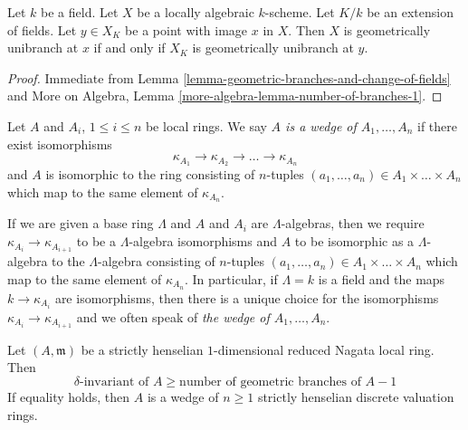 \begin{lemma}
\label{lemma-geometrically-unibranch-and-change-of-fields}
Let $k$ be a field. Let $X$ be a locally algebraic $k$-scheme.
Let $K/k$ be an extension of fields. Let $y \in X_K$ be a
point with image $x$ in $X$. Then $X$ is geometrically unibranch
at $x$ if and only if $X_K$ is geometrically unibranch at $y$.
\end{lemma}

\begin{proof}
Immediate from
Lemma \ref{lemma-geometric-branches-and-change-of-fields}
and More on Algebra, Lemma \ref{more-algebra-lemma-number-of-branches-1}.
\end{proof}

\begin{definition}
\label{definition-wedge}
Let $A$ and $A_i$, $1 \leq i \leq n$ be local rings. We say
{\it $A$ is a wedge of $A_1, \ldots, A_n$}
if there exist isomorphisms
$$
\kappa_{A_1} \to \kappa_{A_2} \to \ldots \to \kappa_{A_n}
$$
and $A$ is isomorphic to the ring consisting of $n$-tuples
$(a_1, \ldots, a_n) \in A_1 \times \ldots \times A_n$ which map to the
same element of $\kappa_{A_n}$.
\end{definition}

\noindent
If we are given a base ring $\Lambda$ and $A$ and $A_i$ are $\Lambda$-algebras,
then we require $\kappa_{A_i} \to \kappa_{A_{i + 1}}$
to be a $\Lambda$-algebra isomorphisms
and $A$ to be isomorphic as a $\Lambda$-algebra to the $\Lambda$-algebra
consisting  of $n$-tuples
$(a_1, \ldots, a_n) \in A_1 \times \ldots \times A_n$ which map to the
same element of $\kappa_{A_n}$. In particular, if $\Lambda = k$ is a field
and the maps $k \to \kappa_{A_i}$ are isomorphisms, then
there is a unique choice for the isomorphisms
$\kappa_{A_i} \to \kappa_{A_{i + 1}}$ and
we often speak of {\it the wedge of $A_1, \ldots, A_n$}.

\begin{lemma}
\label{lemma-delta-number-branches-inequality-sh}
Let $(A, \mathfrak m)$ be a strictly henselian
$1$-dimensional reduced Nagata local ring. Then
$$
\delta\text{-invariant of }A \geq \text{number of geometric branches of }A - 1
$$
If equality holds, then $A$ is a wedge of $n \geq 1$ strictly henselian
discrete valuation rings.
\end{lemma}

